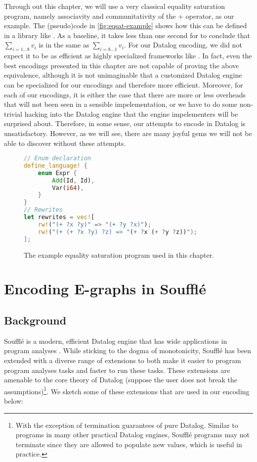 Through out this chapter, we will use a very classical equality saturation program,
 namely associavity and communitativity of the $+$ operator, as our example.
The (pseudo)code in \autoref{fig:eqsat-example} shows how this can be defined in a library like \egg.
As a baseline, it takes less than one second for \egg to conclude that
 $\sum_{i=1\ldots 8}v_i$ is in the same \eclass as $\sum_{i=8\ldots 1}v_i$.
For our Datalog encoding,
 we did not expect it to be as efficient as highly specialized \egraph frameworks like \egg.
In fact, even the best encodings presented in this chapter
 are not capable of proving the above equivalence,
 although it is not unimaginable that a customized Datalog engine can be specialized
 for our \egraph encodings and therefore more efficient.
Moreover,
 for each of our encodings,
 it is either the case that there are more or less overheads 
 that will not been seen in a sensible \egraph impelementation,
 or we have to do some non-trivial hacking into the Datalog engine that 
 the engine impelementers will be surprised about.
Therefore, in some sense,
 our attempts to encode \egraphs in Datalog is unsatisfactory.
However, 
 as we will see,
 there are many joyful gems we will not be able to discover without these attempts.

\begin{figure}
\begin{lstlisting}[language=Rust, style=colouredRust]
// Enum declaration
define_language! {
    enum Expr {
        Add(Id, Id),
        Var(i64),
    }
}
// Rewrites
let rewrites = vec![
    rw!("(+ ?x ?y)" => "(+ ?y ?x)");
    rw!("(+ (+ ?x ?y) ?z) => "(+ ?x (+ ?y ?z))");
];
\end{lstlisting}
\caption{The example equality saturation program used in this chapter.}
\label{fig:eqsat-example}
\end{figure}

\section{Encoding E-graphs in Souffl\'e}

\subsection{Background}

Souffl\'e is a modern, efficient Datalog engine 
 that has wide applications in program analyses \citep{doop, souffle, souffle-interpreter}.
While sticking to the dogma of monotonicity, 
 Souffl\'e has been extended with a diverse range of extensions
 to both make it easier to program program analyses tasks
 and faster to run these tasks.
These extensions are amenable to the core theory of Datalog 
 (suppose the user does not break the assumptions)\footnote{With the exception
 of termination guarantees of pure Datalog. 
 Similar to programs in many other practical Datalog engines, 
 Souffl\'e programs may not terminate
 since they are allowed to populate new values, which is useful in practice.}.
We sketch some of these extensions that are used in our encoding below:

